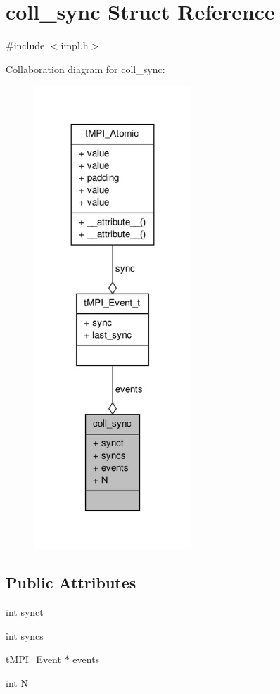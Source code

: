 \hypertarget{structcoll__sync}{\section{coll\-\_\-sync \-Struct \-Reference}
\label{structcoll__sync}
}


{\ttfamily \#include $<$impl.\-h$>$}



\-Collaboration diagram for coll\-\_\-sync\-:
\nopagebreak
\begin{figure}[H]
\begin{center}
\leavevmode
\includegraphics[width=168pt]{structcoll__sync__coll__graph}
\end{center}
\end{figure}
\subsection*{\-Public \-Attributes}
\begin{DoxyCompactItemize}
\item 
int \hyperlink{structcoll__sync_aa84d891d8fca6bae54a1d5261c045709}{synct}
\item 
int \hyperlink{structcoll__sync_a4dc1f14b8600d9fbd4e66a91edfd45d3}{syncs}
\item 
\hyperlink{include_2thread__mpi_2event_8h_a1e973c2d3372299b4635d2bbdd92b549}{t\-M\-P\-I\-\_\-\-Event} $\ast$ \hyperlink{structcoll__sync_addd34cb5edca74913057c39b621a445a}{events}
\item 
int \hyperlink{structcoll__sync_af946c30424e3f6b054469696ae9084d2}{\-N}
\end{DoxyCompactItemize}


